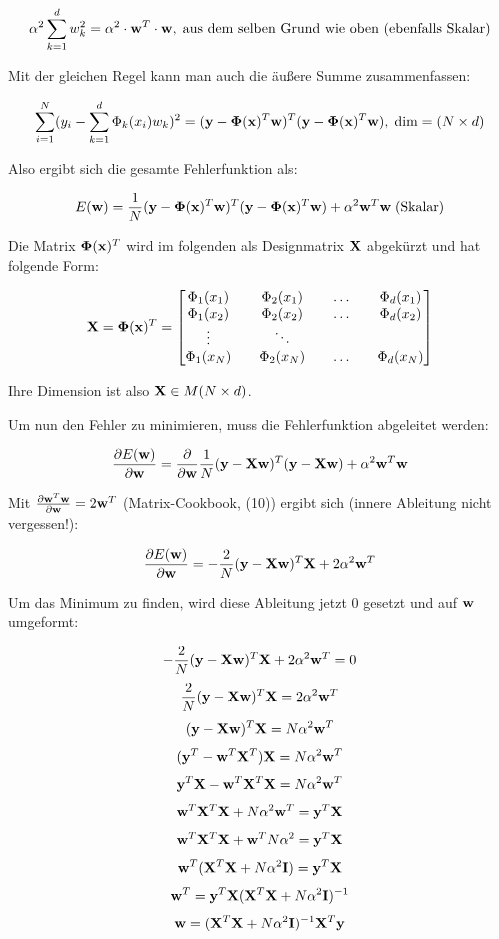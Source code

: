 $$ \alpha^2 \sum_{k=1}^d w_k^2 = \alpha^2 \cdot \mathbf{w}^T \cdot \mathbf{w}, \; \text{aus dem selben Grund wie oben (ebenfalls Skalar)} $$

Mit der gleichen Regel kann man auch die äußere Summe zusammenfassen:

$$ \sum_{i=1}^N (y_i - \sum_{k=1}^{d} \Phi_k(x_i) w_k)^2 = (\mathbf{y} - \mathbf{\Phi}(\mathbf{x})^T \mathbf{w})^T (\mathbf{y} - \mathbf{\Phi}(\mathbf{x})^T \mathbf{w}), \; \text{dim} = (N \times d) $$

Also ergibt sich die gesamte Fehlerfunktion als:

$$ E(\mathbf{w}) = \frac{1}{N} (\mathbf{y} - \mathbf{\Phi}(\mathbf{x})^T \mathbf{w})^T (\mathbf{y} - \mathbf{\Phi}(\mathbf{x})^T \mathbf{w}) + \alpha^2 \mathbf{w}^T \mathbf{w} \; \text{(Skalar)} $$

Die Matrix $ \mathbf{\Phi}(\mathbf{x})^T $ wird im folgenden als Designmatrix $ \mathbf{X} $ abgekürzt und hat folgende Form:

$$ \mathbf{X} = \mathbf{\Phi}(\mathbf{x})^T = \begin{bmatrix} \Phi_1(x_1) && \Phi_2(x_1) && \hdots && \Phi_d(x_1) \\  \Phi_1(x_2) && \Phi_2(x_2) && \hdots && \Phi_d(x_2) \\ \vdots && \ddots \\ \Phi_1(x_N) && \Phi_2(x_N) && \hdots && \Phi_d(x_N) \end{bmatrix} $$

Ihre Dimension ist also $ \mathbf{X} \in M(N \times d) $.

Um nun den Fehler zu minimieren, muss die Fehlerfunktion abgeleitet werden:

$$ \frac{\partial E(\mathbf{w})}{\partial \mathbf{w}} = \frac{\partial}{\partial \mathbf{w}} \frac{1}{N} (\mathbf{y} - \mathbf{X} \mathbf{w})^T (\mathbf{y} - \mathbf{X} \mathbf{w}) + \alpha^2 \mathbf{w}^T \mathbf{w} $$

Mit $ \frac{\partial \mathbf{w}^T \mathbf{w}}{\partial \mathbf{w}} = 2 \mathbf{w}^T $ (Matrix-Cookbook, (10)) ergibt sich (innere Ableitung nicht vergessen!):

$$ \frac{\partial E(\mathbf{w})}{\partial \mathbf{w}} = - \frac{2}{N} (\mathbf{y} - \mathbf{X} \mathbf{w})^T \mathbf{X} + 2 \alpha^2 \mathbf{w}^T $$

Um das Minimum zu finden, wird diese Ableitung jetzt 0 gesetzt und auf $\mathbf{w}$ umgeformt:

$$ - \frac{2}{N} (\mathbf{y} - \mathbf{X} \mathbf{w})^T \mathbf{X} + 2 \alpha^2 \mathbf{w}^T = 0 $$
$$ \frac{2}{N} (\mathbf{y} - \mathbf{X} \mathbf{w})^T \mathbf{X} = 2 \alpha^2 \mathbf{w}^T $$
$$ (\mathbf{y} - \mathbf{X} \mathbf{w})^T \mathbf{X} = N \alpha^2 \mathbf{w}^T $$
$$ (\mathbf{y}^T - \mathbf{w}^T \mathbf{X}^T) \mathbf{X} = N \alpha^2 \mathbf{w}^T $$
$$ \mathbf{y}^T \mathbf{X} - \mathbf{w}^T \mathbf{X}^T \mathbf{X} = N \alpha^2 \mathbf{w}^T $$
$$ \mathbf{w}^T \mathbf{X}^T \mathbf{X} + N \alpha^2 \mathbf{w}^T = \mathbf{y}^T \mathbf{X} $$
$$ \mathbf{w}^T \mathbf{X}^T \mathbf{X} + \mathbf{w}^T N \alpha^2 = \mathbf{y}^T \mathbf{X} $$
$$ \mathbf{w}^T (\mathbf{X}^T \mathbf{X} + N \alpha^2 \mathbf{I}) = \mathbf{y}^T \mathbf{X} $$
$$ \mathbf{w}^T = \mathbf{y}^T \mathbf{X} (\mathbf{X}^T \mathbf{X} + N \alpha^2 \mathbf{I})^{-1} $$
$$ \mathbf{w} = (\mathbf{X}^T \mathbf{X} + N \alpha^2 \mathbf{I})^{-1} \mathbf{X}^T \mathbf{y} $$


